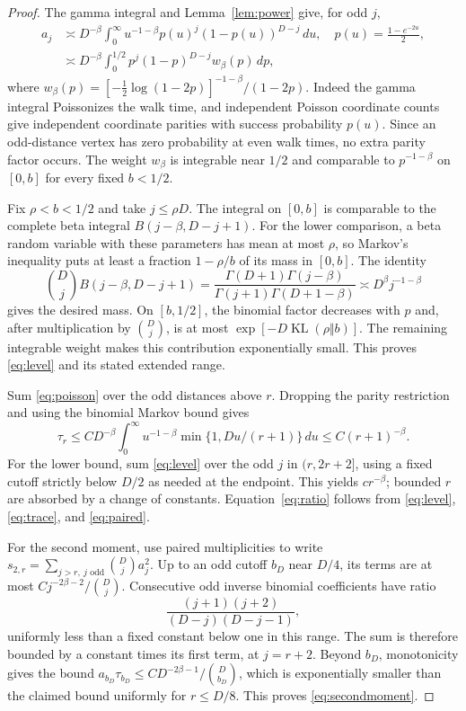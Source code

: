 \begin{proof}
The gamma integral and Lemma~\ref{lem:power} give, for odd $j$,
\begin{align}
 a_j&\asymp D^{-\beta}\int_0^\infty
 u^{-1-\beta}p(u)^j(1-p(u))^{D-j}\,du,
 \quad p(u)=\frac{1-e^{-2u}}2,\label{eq:poisson}\\
 &\asymp D^{-\beta}\int_0^{1/2}p^j(1-p)^{D-j}w_\beta(p)\,dp,
 \label{eq:betaweight}
\end{align}
where $w_\beta(p)=[-\frac12\log(1-2p)]^{-1-\beta}/(1-2p)$.
Indeed the gamma integral Poissonizes the walk time, and independent
Poisson coordinate counts give independent coordinate parities with
success probability $p(u)$. Since an odd-distance vertex has zero
probability at even walk times, no extra parity factor occurs.
The weight $w_\beta$ is integrable near $1/2$ and comparable to
$p^{-1-\beta}$ on $[0,b]$ for every fixed $b<1/2$.

Fix $\rho<b<1/2$ and take $j\le\rho D$. The integral on $[0,b]$
is comparable to the complete beta integral
$B(j-\beta,D-j+1)$. For the lower comparison, a beta random variable
with these parameters has mean at most $\rho$, so Markov's inequality
puts at least a fraction $1-\rho/b$ of its mass in $[0,b]$.
The identity
\[
 \binom Dj B(j-\beta,D-j+1)
 =\frac{\Gamma(D+1)\Gamma(j-\beta)}
        {\Gamma(j+1)\Gamma(D+1-\beta)}
 \asymp D^\beta j^{-1-\beta}
\]
gives the desired mass. On $[b,1/2]$, the binomial factor decreases
with $p$ and, after multiplication by $\binom Dj$, is at most
$\exp[-D\operatorname{KL}(\rho\Vert b)]$. The remaining integrable
weight makes this contribution exponentially small. This proves
\eqref{eq:level} and its stated extended range.

Sum \eqref{eq:poisson} over the odd distances above $r$. Dropping the
parity restriction and using the binomial Markov bound gives
\[
 \tau_r\le C D^{-\beta}\int_0^\infty
 u^{-1-\beta}\min\{1,Du/(r+1)\}\,du
 \le C(r+1)^{-\beta}.
\]
For the lower bound, sum \eqref{eq:level} over the odd $j$ in
$(r,2r+2]$, using a fixed cutoff strictly below $D/2$ as needed at
the endpoint. This yields $c r^{-\beta}$; bounded $r$ are absorbed
by a change of constants. Equation~\eqref{eq:ratio} follows from
\eqref{eq:level}, \eqref{eq:trace}, and \eqref{eq:paired}.

For the second moment, use paired multiplicities to write
$s_{2,r}=\sum_{j>r,\ j\text{ odd}}\binom Dj a_j^2$.
Up to an odd cutoff $b_D$ near $D/4$, its terms are at most
$Cj^{-2\beta-2}/\binom Dj$. Consecutive odd inverse binomial
coefficients have ratio
\[
 \frac{(j+1)(j+2)}{(D-j)(D-j-1)},
\]
uniformly less than a fixed constant below one in this range.
The sum is therefore bounded by a constant times its first term,
at $j=r+2$. Beyond $b_D$, monotonicity gives the bound
$a_{b_D}\tau_{b_D}\le C D^{-2\beta-1}/\binom D{b_D}$,
which is exponentially smaller than the claimed bound uniformly
for $r\le D/8$. This proves \eqref{eq:secondmoment}.
\end{proof}

